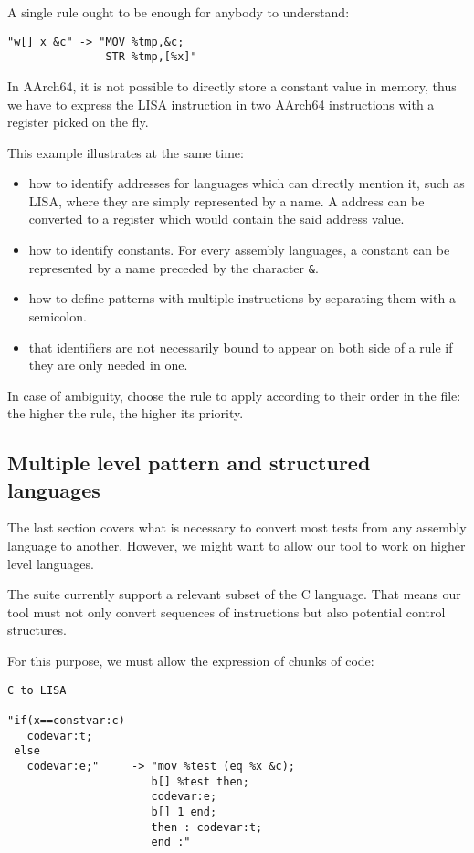 A single rule ought to be enough for anybody to understand:
\begin{verbatim}
"w[] x &c" -> "MOV %tmp,&c;
               STR %tmp,[%x]"
\end{verbatim}

In AArch64, it is not possible to directly store a constant value in memory,
thus we have to express the LISA instruction in two AArch64 instructions
with a register picked on the fly.

This example illustrates at the same time:
\begin{itemize}
\item how to identify addresses for languages which can directly mention it,
such as LISA, where they are simply represented by a name. A address can
be converted to a register which would contain the said address value.
\item how to identify constants. For every assembly languages, a constant can be
represented by a name preceded by the character \verb+&+.
\item how to define patterns with multiple instructions by separating them
with a semicolon.
\item that identifiers are not necessarily bound to appear on both side of
a rule if they are only needed in one.
\end{itemize}

In case of ambiguity, \jingle{} choose the rule to apply according to their order
in the file: the higher the rule, the higher its priority.

\subsection{Multiple level pattern and structured languages}
The last section covers what is necessary to convert most tests from any assembly language
to another. However, we might want to allow our tool to work on higher level languages.

The suite currently support a relevant subset of the C language.
That means our tool must not only convert sequences of instructions but also
potential control structures.

For this purpose, we must allow the expression of chunks of code:

\begin{verbatim}
C to LISA

"if(x==constvar:c)
   codevar:t;
 else
   codevar:e;"     -> "mov %test (eq %x &c);
                      b[] %test then;
                      codevar:e;
                      b[] 1 end;
                      then : codevar:t;
                      end :"
\end{verbatim}

